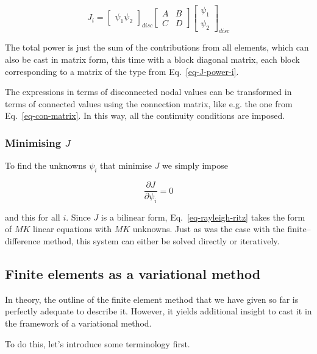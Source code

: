 \begin{equation}
J_i = \begin{bmatrix}
\psi_1 \psi_2 
\end{bmatrix}_{disc}
\begin{bmatrix}
A & B \\
C & D 
\end{bmatrix}
\begin{bmatrix}
\psi_1 \\ \psi_2
\end{bmatrix}_{disc}
\label{eq-J-power-i}
\end{equation} 

The total power is just the sum of the contributions from all elements, which can also be cast in matrix form, this time with a block diagonal matrix, each block corresponding to a matrix of the type from Eq.~\ref{eq-J-power-i}.

The expressions in terms of disconnected nodal values can be transformed in terms of connected values using the connection matrix, like e.g. the one from Eq.~\ref{eq-con-matrix}. In this way, all the continuity conditions are imposed.

\subsubsection{Minimising $J$}

To find the unknowns $\psi_i$ that minimise $J$ we simply impose

\begin{equation}
\frac{\partial J}{\partial \psi_i} = 0 \label{eq-rayleigh-ritz}
\end{equation} 

and this for all $i$. Since $J$ is a bilinear form, Eq.~\ref{eq-rayleigh-ritz} takes the form of $MK$ linear equations with $MK$ unknowns. Just as was the case with the finite--difference method, this system can either be solved directly or iteratively.

\subsection{Finite elements as a variational method}

In theory, the outline of the finite element method that we have given so far is perfectly adequate to describe it. However, it yields additional insight to cast it in the framework of a variational method.

To do this, let's introduce some terminology first.

